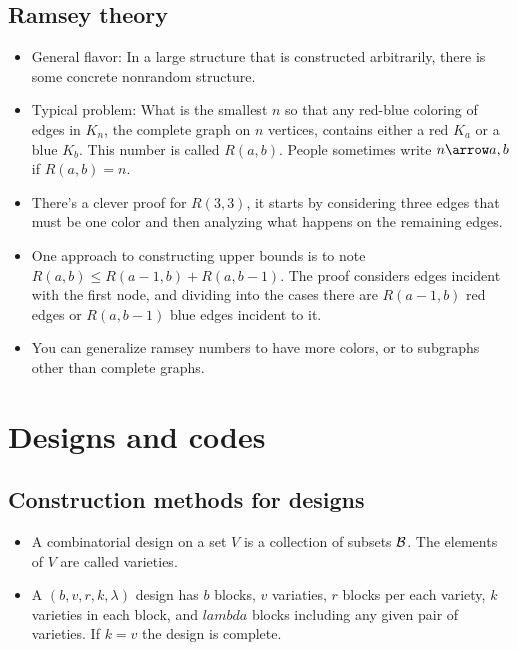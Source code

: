 \documentclass{article}
\begin{document}
\subsection{Ramsey theory}

\begin{itemize}
  \item General flavor: In a large structure that is constructed arbitrarily,
    there is some concrete nonrandom structure.
  \item Typical problem: What is the smallest $n$ so that any red-blue coloring
    of edges in $K_{n}$, the complete graph on $n$ vertices, contains either a
    red $K_{a}$ or a blue $K_{b}$. This number is called $R\left(a, b\right)$.
    People sometimes write $n \arrow a, b$ if $R\left(a, b\right) = n$.
  \item There's a clever proof for $R\left(3, 3\right)$, it starts by
    considering three edges that must be one color and then analyzing what
    happens on the remaining edges.
  \item One approach to constructing upper bounds is to note $R\left(a, b\right)
    \leq R\left(a - 1, b\right) + R\left(a, b - 1\right)$. The proof considers
    edges incident with the first node, and dividing into the cases there are
    $R\left(a - 1, b\right)$ red edges or $R\left(a, b - 1\right)$ blue edges
    incident to it.
  \item You can generalize ramsey numbers to have more colors, or to subgraphs
    other than complete graphs.
\end{itemize}

\section{Designs and codes}

\subsection{Construction methods for designs}

\begin{itemize}
  \item A combinatorial design on a set $V$ is a collection of subsets $\mathcal{B}$. The
    elements of $V$ are called varieties.
    \item A $\left(b, v, r, k, \lambda\right)$ design has $b$ blocks, $v$
      variaties, $r$ blocks per each variety, $k$ varieties in each block, and
      $lambda$ blocks including any given pair of varieties. If $k = v$ the
      design is complete.
\end{itemize}
\end{document}
